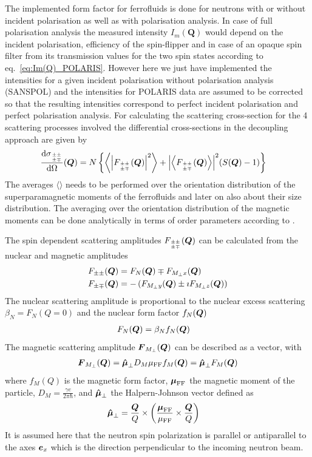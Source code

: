 The implemented form factor for ferrofluids is done for neutrons
with or without incident polarisation as well as with polarisation
analysis. In case of full polarisation analysis the measured
intensity $I_m(\mathbf{Q})$ would depend on the incident
polarisation, efficiency of the spin-flipper and in case of an
opaque spin filter from its transmission values for the two spin
states according to eq.\ \ref{eq:Im(Q)_POLARIS}. However here we
just have implemented the intensities for a given incident
polarisation without polarisation analysis (SANSPOL) and the
intensities for POLARIS data are assumed to be corrected so that the
resulting intensities correspond to perfect incident polarisation
and perfect polarisation analysis. For calculating the scattering
cross-section for the 4 scattering processes involved the
differential cross-sections in the decoupling approach are given by
\begin{align} \label{eq:dsigma_dOmega_ijSQ}
\frac{\mathrm{d}\sigma_{{\pm\pm}\atop{\pm\mp}}}{\mathrm{d}\Omega}(\mbox{\boldmath$Q$})
&= N\left\{ \left\langle
{\left\vert F_{{\pm\pm}\atop{\pm\mp}}(\mbox{\boldmath$Q$})\right\vert}^2\right\rangle +
{\left\vert\left\langle F_{{\pm\pm}\atop{\pm\mp}}(\mbox{\boldmath$Q$})\right\rangle\right\vert}^2
(S(\mbox{\boldmath$Q$})-1) \right\}
\end{align}
The averages $\langle\rangle$ needs to be performed over the
orientation distribution of the superparamagnetic moments of the
ferrofluids and later on also about their size distribution. The
averaging over the orientation distribution of the magnetic moments
can be done analytically in terms of order parameters according to
\cite{Wiedenmann2011,Wagner2005,Kohlbrecher1997}.

The spin dependent scattering amplitudes
$F_{{\pm\pm}\atop{\pm\mp}}(\mbox{\boldmath$Q$})$ can be calculated from the
nuclear and magnetic amplitudes
\begin{align}
F_{\pm\pm}(\mbox{\boldmath$Q$}) & = F_N(\mbox{\boldmath$Q$}) \mp F_{M_\perp x}(\mbox{\boldmath$Q$}) \\
F_{\pm\mp}(\mbox{\boldmath$Q$}) & = -\left(F_{M_\perp y}(\mbox{\boldmath$Q$}) \pm \imath
F_{M_\perp z}(\mbox{\boldmath$Q$})\right)
\end{align}
The nuclear scattering amplitude is proportional to the nuclear
excess scattering $\beta_N=F_N(Q=0)$ and the nuclear form factor
$f_N(\mbox{\boldmath$Q$})$
\begin{align}
F_N(\mbox{\boldmath$Q$}) &= \beta_N f_N(\mbox{\boldmath$Q$})
\end{align}
The magnetic scattering amplitude $\mbox{\boldmath$F$}_{M_\perp}(\mbox{\boldmath$Q$})$ can be
described as a vector, with
\begin{align}
\mbox{\boldmath$F$}_{M_\perp}(\mbox{\boldmath$Q$}) =  \mbox{\boldmath$\hat{\mu}$}_\perp D_M \mu_\text{FF}
f_M(\mbox{\boldmath$Q$})=\mbox{\boldmath$\hat{\mu}$}_\perp F_M(\mbox{\boldmath$Q$})
\end{align}
where $f_M(Q)$ is the magnetic form factor, $\mbox{\boldmath$\mu$}_\text{FF}$ the
magnetic moment of the particle, $D_M=\frac{\gamma e}{2\pi\hbar}$,
and $\mbox{\boldmath$\hat{\mu}$}_\perp$ the Halpern-Johnson vector defined as
\begin{align}
\mbox{\boldmath$\hat{\mu}$}_\perp &=
\frac{\mbox{\boldmath$Q$}}{Q}\times\left(\frac{\mbox{\boldmath$\mu$}_\text{FF}}{\mu_\text{FF}}\times\frac{\mbox{\boldmath$Q$}}{Q}\right)
\end{align}
It is assumed here that the neutron spin polarization is parallel or
antiparallel to the axes $\mbox{\boldmath$e$}_x$ which is the direction
perpendicular to the incoming neutron beam.


